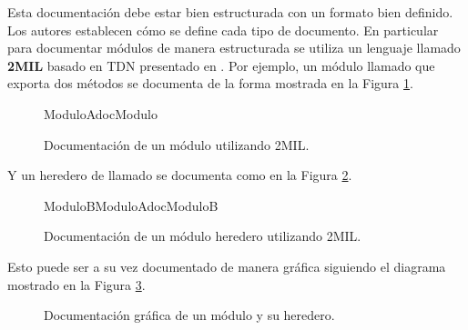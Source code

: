 
Esta documentación debe estar bien estructurada con un formato bien definido. Los autores establecen cómo se define cada tipo de documento. En particular para documentar módulos de manera estructurada se utiliza un lenguaje llamado \textbf{2MIL} basado en TDN presentado en \cite{2mil}. Por ejemplo, un módulo llamado \ModuloA que exporta dos métodos se documenta de la forma mostrada en la Figura \ref{docModulo}.

\begin{figure}[H]
\caption{Documentación de un módulo utilizando 2MIL.}
\label{docModulo}
\begin{module}[]{ModuloA}{}{docModulo}
  \exports
\end{module}
\end{figure}

Y un heredero de \ModuloA llamado \ModuloB se documenta como en la Figura \ref{docModuloHere}.

\begin{figure}[H]
\caption{Documentación de un módulo heredero utilizando 2MIL.}
\label{docModuloHere}
\begin{hmodule}[]{ModuloB}{ModuloA}{}{docModuloB}
  \exports
\end{hmodule}
\end{figure}

Esto puede ser a su vez documentado de manera gráfica siguiendo el diagrama mostrado en la Figura \ref{moduloGraf}.

\begin{figure}[H]
\begin{center}
\caption{Documentación gráfica de un módulo y su heredero.}
\label{moduloGraf}
\end{center}
\end{figure}

